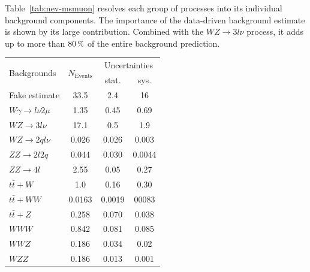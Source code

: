 \noindent Table~\ref{tab:nev-msmuon} resolves each group of processes into its individual background components. The importance of the data-driven background estimate is shown by its large contribution. Combined with the $WZ \rightarrow 3l \nu$ process, it adds up to more than $80\,\pct$ of the entire background prediction.

\begin{table}[!htb]
  \centering
  \begin{tabular}{|l|c|c|c|}
    \hline
    \multirow{2}{*}{Backgrounds}    & \multirow{2}{*}{$N_{\text{Events}}$} & \multicolumn{2}{|c|}{Uncertainties} \\ \cline{3-4}
                                    &                                      & stat.  & sys.                       \\ \hline \hline
    Fake estimate                   & 33.5                                 & 2.4    & 16                         \\ \hline
    $W\gamma \rightarrow l\nu 2\mu$ & 1.35                                 & 0.45   & 0.69                       \\
    $WZ \rightarrow 3l \nu$         & 17.1                                 & 0.5    & 1.9                        \\
    $WZ \rightarrow 2q l \nu$       & 0.026                                & 0.026  & 0.003                      \\
    $ZZ \rightarrow 2l 2q$          & 0.044                                & 0.030  & 0.0044                     \\
    $ZZ \rightarrow 4l$             & 2.55                                 & 0.05   & 0.27                       \\ \hline
    $t\bar{t} + W$                  & 1.0                                  & 0.16   & 0.30                       \\
    $t\bar{t} + WW$                 & 0.0163                               & 0.0019 & 00083                      \\
    $t\bar{t} + Z$                  & 0.258                                & 0.070  & 0.038                      \\ \hline
    $WWW$                           & 0.842                                & 0.081  & 0.085                      \\
    $WWZ$                           & 0.186                                & 0.034  & 0.02                       \\
    $WZZ$                           & 0.186                                & 0.013  & 0.001                      \\

\end{tabular}
\end{table}
